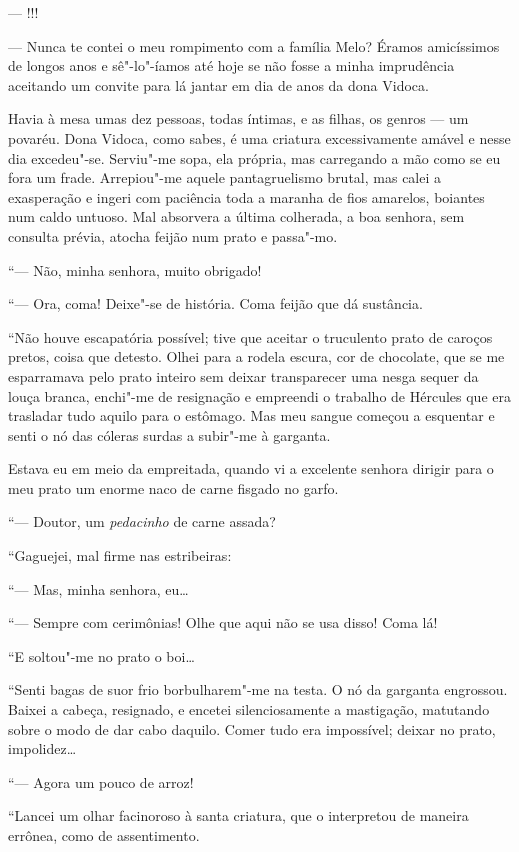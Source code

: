 --- !!!

--- Nunca te contei o meu rompimento com a família Melo? Éramos
amicíssimos de longos anos e sê"-lo"-íamos até hoje se não fosse a minha
imprudência aceitando um convite para lá jantar em dia de anos da dona
Vidoca.

Havia à mesa umas dez pessoas, todas íntimas, e as filhas, os genros ---
um povaréu. Dona Vidoca, como sabes, é uma criatura excessivamente
amável e nesse dia excedeu"-se. Serviu"-me sopa, ela própria, mas
carregando a mão como se eu fora um frade. Arrepiou"-me aquele
pantagruelismo brutal, mas calei a exasperação e ingeri com paciência
toda a maranha de fios amarelos, boiantes num caldo untuoso. Mal
absorvera a última colherada, a boa senhora, sem consulta prévia, atocha
feijão num prato e passa"-mo.

``--- Não, minha senhora, muito obrigado!

``--- Ora, coma! Deixe"-se de história. Coma feijão que dá sustância.

``Não houve escapatória possível; tive que aceitar o truculento prato de
caroços pretos, coisa que detesto. Olhei para a rodela escura, cor de
chocolate, que se me esparramava pelo prato inteiro sem deixar
transparecer uma nesga sequer da louça branca, enchi"-me de resignação e
empreendi o trabalho de Hércules que era trasladar tudo aquilo para o
estômago. Mas meu sangue começou a esquentar e senti o nó das cóleras
surdas a subir"-me à garganta.

Estava eu em meio da empreitada, quando vi a excelente senhora dirigir
para o meu prato um enorme naco de carne fisgado no garfo.

``--- Doutor, um \emph{pedacinho} de carne assada?

``Gaguejei, mal firme nas estribeiras:

``--- Mas, minha senhora, eu\ldots{}

``--- Sempre com cerimônias! Olhe que aqui não se usa disso! Coma lá!

``E soltou"-me no prato o boi\ldots{}

``Senti bagas de suor frio borbulharem"-me na testa. O nó da garganta
engrossou. Baixei a cabeça, resignado, e encetei silenciosamente a
mastigação, matutando sobre o modo de dar cabo daquilo. Comer tudo era
impossível; deixar no prato, impolidez\ldots{}

``--- Agora um pouco de arroz!

``Lancei um olhar facinoroso à santa criatura, que o interpretou de
maneira errônea, como de assentimento.

